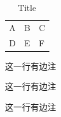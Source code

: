 \documentclass{ctexart}
\begin{document}
            \begin{table}
                \centering
                \caption{Title\protect\footnotemark}
                \begin{tabular}{l|l|l}
                    \hline
                    A&B&C\\
                    D&E&F\\
                    \hline
                \end{tabular}
            \end{table}

            
            

            这一行有边注

            {这一行有边注
            \reversemarginpar
            
            这一行有边注
            
            }
\end{document}
